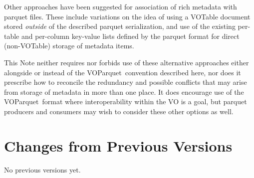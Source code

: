 \documentclass[11pt,a4paper]{ivoa}
\newcommand{\voparquet}{VOParquet}
\begin{document}
Other approaches have been suggested for association of rich metadata
with parquet files.
These include variations on the idea of
using a VOTable document stored {\em outside\/} of the described parquet
serialization,
and use of the existing per-table and per-column key-value lists
defined by the parquet format for direct (non-VOTable) storage
of metadata items.

This Note neither requires nor forbids use of these alternative
approaches either alongside or instead of the \voparquet\ convention
described here, nor does it prescribe how to reconcile
the redundancy and possible conflicts that may arise from
storage of metadata in more than one place.
It does encourage use of the \voparquet\ format where interoperability
within the VO is a goal,
but parquet producers and consumers may wish to consider these other
options as well.



\appendix
\section{Changes from Previous Versions}

No previous versions yet.


\end{document}
